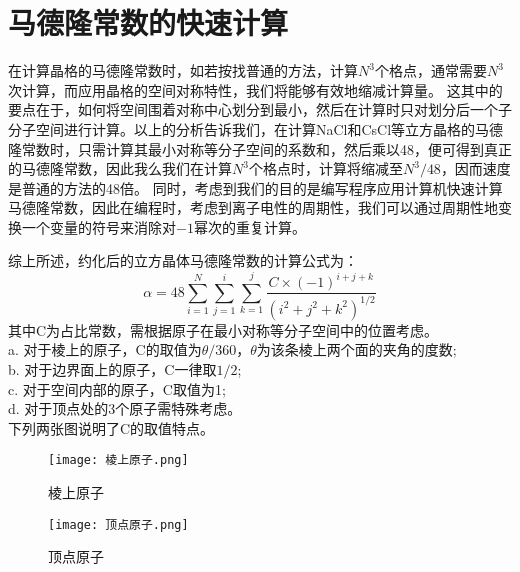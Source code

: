 \documentclass{style}
\begin{document}
\section{马德隆常数的快速计算} %
\label{sec:马德隆常数的快速计算}
在计算晶格的马德隆常数时，如若按找普通的方法，计算$N^3$个格点，通常需要$N^3$次计算，而应用晶格的空间对称特性，我们将能够有效地缩减计算量。 这其中的要点在于，如何将空间围着对称中心划分到最小，然后在计算时只对划分后一个子分子空间进行计算。以上的分析告诉我们，在计算NaCl和CsCl等立方晶格的马德隆常数时，只需计算其最小对称等分子空间的系数和，然后乘以48，便可得到真正的马德隆常数，因此我么我们在计算$N^3$个格点时，计算将缩减至$N^3/48$，因而速度是普通的方法的48倍。
同时，考虑到我们的目的是编写程序应用计算机快速计算马德隆常数，因此在编程时，考虑到离子电性的周期性，我们可以通过周期性地变换一个变量的符号来消除对$-1$幂次的重复计算。

综上所述，约化后的立方晶体马德隆常数的计算公式为：
\begin{equation}\label{eqution:fast_madelung}
    \alpha = 48\sum\limits_{i=1}^{N}\sum\limits_{j=1}^{i}\sum\limits_{k=1}^{j}{\frac{C\times(-1)^{i+j+k}}{(i^2+j^2+k^2)^{1/2}}}
\end{equation}
其中C为占比常数，需根据原子在最小对称等分子空间中的位置考虑。\\
\indent a. 对于棱上的原子，C的取值为$\theta/360$，$\theta$为该条棱上两个面的夹角的度数;\\
\indent b. 对于边界面上的原子，C一律取$1/2$;\\
\indent c. 对于空间内部的原子，C取值为1;\\
\indent d. 对于顶点处的3个原子需特殊考虑。\\

下列两张图说明了C的取值特点。\\
\begin{figure}[H]
\begin{minipage}[H]{0.5\linewidth}
\centering
\texttt{[image: 棱上原子.png]}
\caption{棱上原子}
\label{fig:side:a}
\end{minipage}%
\begin{minipage}[H]{0.5\linewidth}
\centering
\texttt{[image: 顶点原子.png]}
\caption{顶点原子}
\label{fig:side:b}
\end{minipage}
\end{figure}
\end{document}
